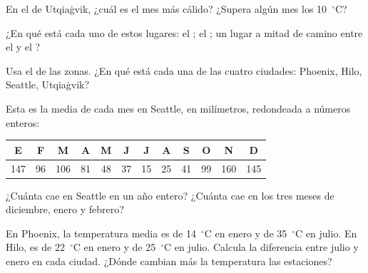 \begin{exercise}[$\star$]\label{exo:g5:weather-and-climate:4}
En el  de Utqiaġvik, ¿cuál es el mes más cálido? ¿Supera algún
mes los 10~$^\circ$C?
\end{exercise}

\begin{exercise}[$\star$]\label{exo:g5:weather-and-climate:5}
¿En qué  está cada uno de estos lugares: el ; el ; un lugar a mitad de camino entre el  y el ?
\end{exercise}

\begin{exercise}[$\star$]\label{exo:g5:weather-and-climate:6}
Usa el  de las zonas. ¿En qué  está cada una de las
cuatro ciudades: Phoenix, Hilo, Seattle, Utqiaġvik?
\end{exercise}

\begin{exercise}[$\star\star$]\label{exo:g5:weather-and-climate:7}
Esta es la  media de cada mes en Seattle, en milímetros, redondeada a
números enteros:
\begin{center}
\begin{tabular}{|*{12}{c|}}
\hline
E & F & M & A & M & J & J & A & S & O & N & D\\
\hline
147 & 96 & 106 & 81 & 48 & 37 & 15 & 25 & 41 & 99 & 160 & 145\\
\hline
\end{tabular}
\end{center}
¿Cuánta  cae en Seattle en un año entero? ¿Cuánta cae en los tres
meses de diciembre, enero y febrero?
\end{exercise}

\begin{exercise}[$\star\star$]\label{exo:g5:weather-and-climate:8}
En Phoenix, la temperatura media es de 14~$^\circ$C en enero y de
35~$^\circ$C en julio. En Hilo, es de 22~$^\circ$C en enero y de
25~$^\circ$C en julio. Calcula la diferencia entre julio y enero en cada
ciudad. ¿Dónde cambian más la temperatura las estaciones?
\end{exercise}

